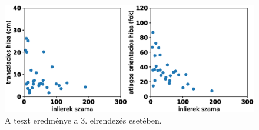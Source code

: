 \begin{figure}[H]
\centering
\includegraphics[width=0.9\linewidth]{chapters/results/err3.eps}
\caption{A teszt eredménye a 3. elrendezés esetében.}
\label{fig:scatter3}
\end{figure}